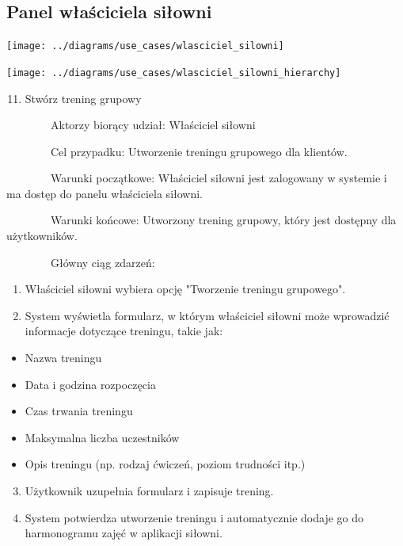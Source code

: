 \subsection{Panel właściciela siłowni}\label{subsec:panel-wasciciela-siowni}

{\texttt{[image: ../diagrams/use\_cases/wlasciciel\_silowni]}}

{\texttt{[image: ../diagrams/use\_cases/wlasciciel\_silowni\_hierarchy]}}

\begin{enumerate}
\setcounter{enumi}{10}
\tightlist
\item
  {Stwórz trening grupowy}
\end{enumerate}

{~~~~~~~~}{Aktorzy biorący udział: Właściciel siłowni}

{~~~~~~~~Cel przypadku: Utworzenie treningu grupowego dla klientów.}

{~~~~~~~~Warunki początkowe: Właściciel siłowni jest zalogowany w
systemie i ma dostęp do panelu właściciela siłowni.}

{~~~~~~~~Warunki końcowe: Utworzony trening grupowy, który jest dostępny
dla użytkowników.}

{~~~~~~~~Główny ciąg zdarzeń:}

\begin{enumerate}
\tightlist
\item
  {Właściciel siłowni wybiera opcję "Tworzenie treningu grupowego".}
\item
  {System wyświetla formularz, w którym właściciel siłowni może
  wprowadzić informacje dotyczące treningu, takie jak:}
\end{enumerate}

\begin{itemize}
\tightlist
\item
  {Nazwa treningu}
\item
  {Data i godzina rozpoczęcia}
\item
  {Czas trwania treningu}
\item
  {Maksymalna liczba uczestników}
\item
  {Opis treningu (np. rodzaj ćwiczeń, poziom trudności itp.)}
\end{itemize}

\begin{enumerate}
\setcounter{enumi}{2}
\tightlist
\item
  {Użytkownik uzupełnia formularz i zapisuje trening.}
\item
  {System potwierdza utworzenie treningu i automatycznie dodaje go do
  harmonogramu zajęć w aplikacji siłowni.}
\end{enumerate}

